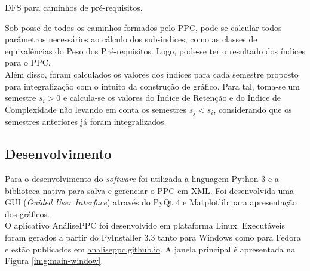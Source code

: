 \documentclass[a4paper, 12pt]{article}
\begin{document}
\begin{algorithm}[H]
\small
\SetAlgoNoLine
{}
\Retorna{$\Gamma$}
\caption{DFS para caminhos de pré-requisitos.}
\end{algorithm}

Sob posse de todos os caminhos formados pelo PPC, pode-se calcular todos parâmetros necessários ao cálculo dos sub-índices, como as classes de equivalências do Peso 
dos Pré-requisitos. Logo, pode-se ter o resultado dos índices para o PPC. \\

Além disso, foram calculados os valores dos índices para cada semestre proposto para integralização com o intuito da construção de gráfico. Para tal, toma-se um 
semestre $s_i > 0$ e calcula-se os valores do Índice de Retenção e do Índice de Complexidade não levando em conta os semestres $s_j < s_i$, considerando que os 
semestres anteriores já foram integralizados.

\subsection*{Desenvolvimento}

Para o desenvolvimento do \textit{software} foi utilizada a linguagem Python 3 e a biblioteca nativa para salva e gerenciar o PPC em XML. Foi desenvolvida uma 
GUI (\textit{Guided User Interface}) através do PyQt 4 e Matplotlib para apresentação dos gráficos. \\ 

O aplicativo AnálisePPC foi desenvolvido em plataforma Linux. Executáveis foram gerados a partir do PyInstaller 3.3 tanto para Windows como para Fedora e estão publicados em 
\url{analiseppc.github.io}. A janela principal é apresentada na Figura \ref{img:main-window}.
\end{document}
